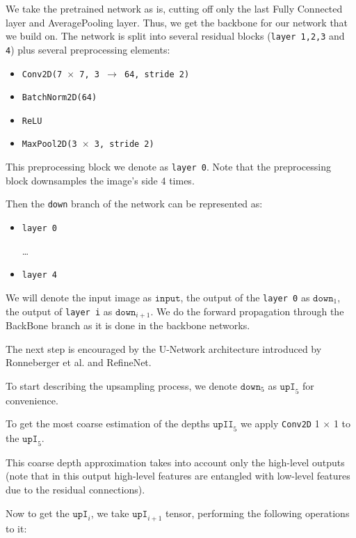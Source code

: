\documentclass[10pt,twocolumn,letterpaper]{article}
\begin{document}
We take the pretrained network as is, cutting off only the last Fully Connected layer
and AveragePooling layer. Thus, we get the backbone for our network that
we build on. The network is split into several residual blocks
(\texttt{layer 1,2,3} and \texttt{4}) plus several preprocessing elements:

\begin{itemize}
  \item \texttt{Conv2D(7 $\times$ 7, 3 $\rightarrow$ 64, stride 2)}
  \item \texttt{BatchNorm2D(64)}
  \item \texttt{ReLU}
  \item \texttt{MaxPool2D(3 $\times$ 3, stride 2)}
\end{itemize}

This preprocessing block we denote as \texttt{layer 0}. Note that the preprocessing block
downsamples the image's side 4 times.


Then the \texttt{down} branch of the network can be represented as:
\begin{itemize}
  \item \texttt{layer 0}
  
  \dots
  
  \item \texttt{layer 4}
\end{itemize}

We will denote the input image as $\texttt{input}$, the output of the
\texttt{layer 0} as $\texttt{down}_1$, 
the output of \texttt{layer i} as $\texttt{down}_{i+1}$.
We do the forward propagation through the BackBone branch as it is done in 
the backbone networks.

The next step is encouraged by the U-Network architecture introduced by
Ronneberger et al. \cite{ronneberger2015u} and RefineNet.

To start describing the upsampling process, we denote $\texttt{down}_5$
as $\texttt{upI}_5$ for convenience.

To get the most coarse estimation of the depths $\texttt{upII}_5$
we apply \texttt{Conv2D} 1 $\times$ 1 to the $\texttt{upI}_5$.

This coarse depth approximation takes into account
only the high-level outputs (note that in this output high-level features
are entangled with low-level features due to the residual connections).

Now to get the $\texttt{upI}_i$, we take $\texttt{upI}_{i+1}$ tensor, 
performing the following operations to it:
\end{document}
